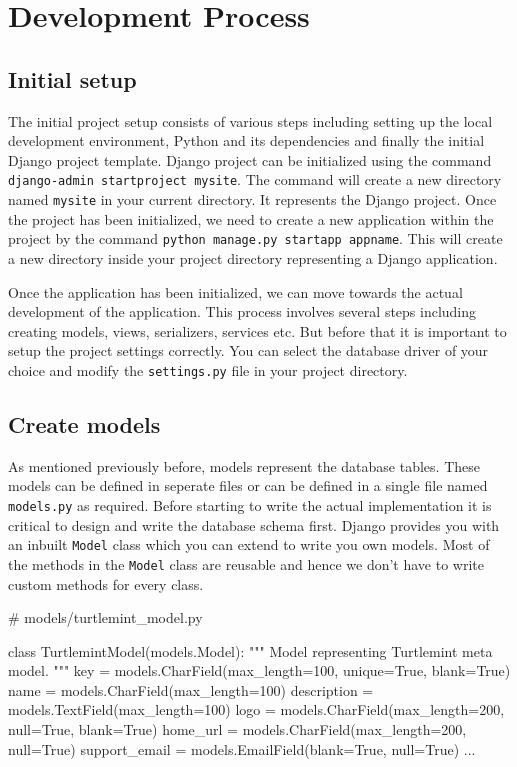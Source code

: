 \chapter{Development Process}

\section{Initial setup}
The initial project setup consists of various steps including setting up the
local development environment, Python and its dependencies and finally the
initial Django project template. Django project can be initialized using the
command \texttt{django-admin startproject mysite}. The command will create a
new directory named \texttt{mysite} in your current directory. It represents
the Django project. Once the project has been initialized, we need to create
a new application within the project by the command
\texttt{python manage.py startapp appname}. This will create a new directory
inside your project directory representing a Django application.

Once the application has been initialized, we can move towards the actual
development of the application. This process involves several steps including
creating models, views, serializers, services etc. But before that it is
important to setup the project settings correctly. You can select the database
driver of your choice and modify the \texttt{settings.py} file in your project
directory.

\section{Create models}
As mentioned previously before, models represent the database tables. These
models can be defined in seperate files or can be defined in a single file
named \texttt{models.py} as required. Before starting to write the actual
implementation it is critical to design and write the database schema first.
Django provides you with an inbuilt \texttt{Model} class which you can extend
to write you own models. Most of the methods in the \texttt{Model} class are
reusable and hence we don't have to write custom methods for every class.

\begin{pythoncode}
# models/turtlemint_model.py

class TurtlemintModel(models.Model):
    """
    Model representing Turtlemint meta model.
    """
    key = models.CharField(max_length=100, unique=True, blank=True)
    name = models.CharField(max_length=100)
    description = models.TextField(max_length=100)
    logo = models.CharField(max_length=200, null=True, blank=True)
    home_url = models.CharField(max_length=200, null=True)
    support_email = models.EmailField(blank=True, null=True)
    ...
\end{pythoncode}

